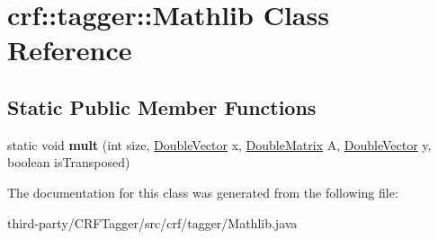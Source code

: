 \hypertarget{classcrf_1_1tagger_1_1Mathlib}{
\section{crf::tagger::Mathlib Class Reference}
\label{classcrf_1_1tagger_1_1Mathlib}
}
\subsection*{Static Public Member Functions}
\begin{DoxyCompactItemize}
\item 
\hypertarget{classcrf_1_1tagger_1_1Mathlib_a7f1ab68ff7ada35bee5b4ffbdc40bb9c}{
static void {\bfseries mult} (int size, \hyperlink{classcrf_1_1tagger_1_1DoubleVector}{DoubleVector} x, \hyperlink{classcrf_1_1tagger_1_1DoubleMatrix}{DoubleMatrix} A, \hyperlink{classcrf_1_1tagger_1_1DoubleVector}{DoubleVector} y, boolean isTransposed)}
\label{classcrf_1_1tagger_1_1Mathlib_a7f1ab68ff7ada35bee5b4ffbdc40bb9c}

\end{DoxyCompactItemize}


The documentation for this class was generated from the following file:\begin{DoxyCompactItemize}
\item 
third-\/party/CRFTagger/src/crf/tagger/Mathlib.java\end{DoxyCompactItemize}
